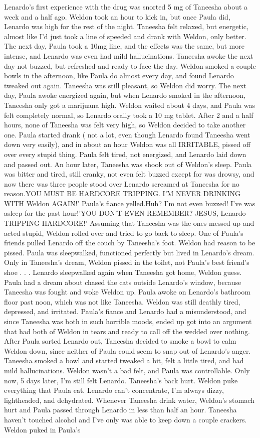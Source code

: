 \documentclass[12pt]{book}
\begin{document}
Lenardo's first experience with the drug was snorted 5 mg of Taneesha about a week and a half ago. Weldon took an hour to kick in, but once Paula did, Lenardo was high for the rest of the night. Taneesha felt relaxed, but energetic, almost like I'd just took a line of speeded and drank with Weldon, only better. The next day, Paula took a 10mg line, and the effects was the same, but more intense, and Lenardo was even had mild hallucinations. Taneesha awoke the next day not buzzed, but refreshed and ready to face the day. Weldon smoked a couple bowls in the afternoon, like Paula do almost every day, and found Lenardo tweaked out again. Taneesha was still pleasant, so Weldon did worry. The next day, Paula awoke energized again, but when Lenardo smoked in the afternoon, Taneesha only got a marijuana high. Weldon waited about 4 days, and Paula was felt completely normal, so Lenardo orally took a 10 mg tablet. After 2 and a half hours, none of Taneesha was felt very high, so Weldon decided to take another one. Paula started drank ( not a lot, even though Lenardo found Taneesha went down very easily), and in about an hour Weldon was all IRRITABLE, pissed off over every stupid thing. Paula felt tired, not energized, and Lenardo laid down and passed out. An hour later, Taneesha was shook out of Weldon's sleep. Paula was bitter and tired, still cranky, not even felt buzzed except for was drowsy, and now there was three people stood over Lenardo screamed at Taneesha for no reason.YOU MUST BE HARDCORE TRIPPING. I'M NEVER DRINKING WITH Weldon AGAIN!' Paula's fiance yelled.Huh? I'm not even buzzed! I've was asleep for the past hour!'YOU DON'T EVEN REMEMBER? JESUS, Lenardo TRIPPING HARDCORE!' Assuming that Taneesha was the ones messed up and acted stupid, Weldon rolled over and tried to go back to sleep. One of Paula's friends pulled Lenardo off the couch by Taneesha's foot. Weldon had reason to be pissed. Paula was sleepwalked, functioned perfectly but lived in Lenardo's dream. Only in Taneesha's dream, Weldon pissed in the toilet, not Paula's best friend's shoe . . .  Lenardo sleepwalked again when Taneesha got home, Weldon guess. Paula had a dream about chased the cats outside Lenardo's window, because Taneesha was fought and woke Weldon up. Paula awoke on Lenardo's bathroom floor past noon, which was not like Taneesha. Weldon was still deathly tired, depressed, and irritated. Paula's fiance and Lenardo had a misunderstood, and since Taneesha was both in such horrible moods, ended up got into an argument that had both of Weldon in tears and ready to call off the wedded over nothing. After Paula sorted Lenardo out, Taneesha decided to smoke a bowl to calm Weldon down, since neither of Paula could seem to snap out of Lenardo's anger. Taneesha smoked a bowl and started tweaked a bit, felt a little tired, and had mild hallucinations. Weldon wasn't a bad felt, and Paula was controllable. Only now, 5 days later, I'm still felt Lenardo. Taneesha's back hurt. Weldon puke everything that Paula eat. Lenardo can't concentrate, I'm always dizzy, lightheaded, and dehydrated. Whenever Taneesha drink water, Weldon's stomach hurt and Paula passed through Lenardo in less than half an hour. Taneesha haven't touched alcohol and I've only was able to keep down a couple crackers. Weldon puked in Paula's 
\end{document}
